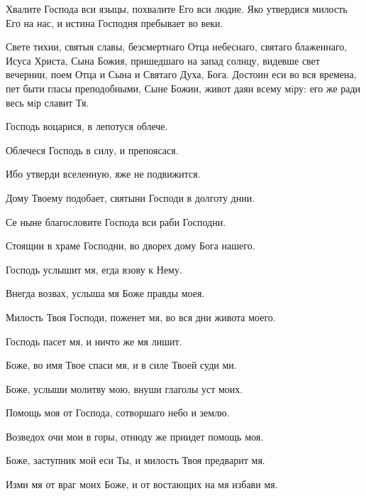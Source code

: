 \begin{mymulticols}
Хвалите Господа вси языцы, похвалите Его вси людие. Яко утвердися милость Его на нас, и истина Господня пребывает во веки.


Свете тихии, святыя славы, безсмертнаго Отца небеснаго, святаго блаженнаго, Исуса Христа, Сына Божия, пришедшаго на запад солнцу, видевше свет вечернии, поем Отца и Сына и Святаго Духа, Бога. Достоин еси во вся времена, пет быти гласы преподобными, Сыне Божии, живот даяи всему мiру: его же ради весь мiр славит Тя.

 Господь воцарися, в лепотуся облече. 

 Облечеся Господь в силу, и препоясася.

 Ибо утверди вселенную, яже не подвижится.

 Дому Твоему подобает, святыни Господи в долготу днии.

 Се ныне благословите Господа вси раби Господни.

 Стоящии в храме Господни, во дворех дому Бога нашего.

 Господь услышит мя, егда взову к Нему.

 Внегда возвах, услыша мя Боже правды моея.

 Милость Твоя Господи, поженет мя, во вся дни живота моего.

 Господь пасет мя, и ничто же мя лишит.

 Боже, во имя Твое спаси мя, и в силе Твоей суди ми.

 Боже, услыши молитву мою, внуши глаголы уст моих.

 Помощь моя от Господа, сотворшаго небо и землю.

 Возведох очи мои в горы, отнюду же приидет помощь моя.

 Боже, заступник мой еси Ты, и милость Твоя предварит мя.

 Изми мя от враг моих Боже, и от востающих на мя избави мя.



\end{mymulticols}
